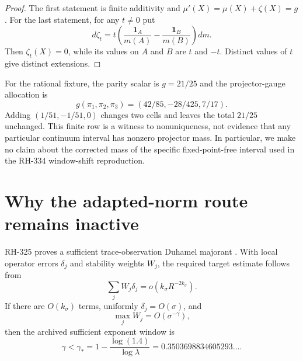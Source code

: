 \documentclass[11pt]{article}
\theoremstyle{remark}
\newcommand{\one}{\mathbf 1}
\begin{document}
\begin{proof}
The first statement is finite additivity and
$\mu'(X)=\mu(X)+\zeta(X)=g$.  For the last statement, for any $t\ne0$ put
\[
 d\zeta_t=t\left(
 \frac{\one_A}{m(A)}-\frac{\one_B}{m(B)}
 \right)dm.
\]
Then $\zeta_t(X)=0$, while its values on $A$ and $B$ are $t$ and $-t$.
Distinct values of $t$ give distinct extensions.
\end{proof}

For the rational fixture, the parity scalar is $g=21/25$ and the
projector-gauge allocation is
\begin{equation}\label{eq:base-allocation}
 g(\pi_1,\pi_2,\pi_3)
 =(42/85,-28/425,7/17).
\end{equation}
Adding $(1/51,-1/51,0)$ changes two cells and leaves the total $21/25$
unchanged.  This finite row is a witness to nonuniqueness, not evidence that
any particular continuum interval has nonzero projector mass.  In
particular, we make no claim about the corrected mass of the specific
fixed-point-free interval used in the RH-334 window-shift reproduction.

\section{Why the adapted-norm route remains inactive}

RH-325 proves a sufficient trace-observation Duhamel majorant
\citep{WangMovingDuhamel2026}.  With local operator errors $\delta_j$ and
stability weights $W_j$, the required target estimate follows from
\begin{equation}\label{eq:duhamel-majorant}
 \sum_jW_j\delta_j=o(k_\sigma R^{-2k_\sigma}).
\end{equation}
If there are $O(k_\sigma)$ terms, uniformly
$\delta_j=O(\sigma)$, and
\begin{equation}\label{eq:gamma-upper}
 \max_jW_j=O(\sigma^{-\gamma}),
\end{equation}
then the archived sufficient exponent window is
\begin{equation}\label{eq:gamma-star}
 \gamma<\gamma_*
 =1-\frac{\log(1.4)}{\log\lambda}
 =0.3503698834605293\ldots .
\end{equation}
\end{document}
